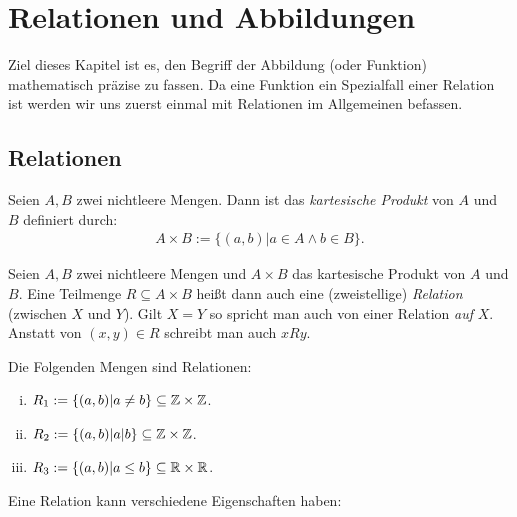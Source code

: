 \chapter{Relationen und Abbildungen}

Ziel dieses Kapitel ist es, den Begriff der Abbildung (oder Funktion) mathematisch präzise zu fassen. 
Da eine Funktion ein Spezialfall einer Relation ist werden wir uns zuerst einmal mit Relationen im Allgemeinen befassen.

\section{Relationen}

\begin{mydef}
    Seien $A,B$ zwei nichtleere Mengen. Dann ist das \textit{kartesische Produkt} von $A$ und $B$ definiert durch:
    \begin{align*}
        A \times B := \{ (a,b) | a \in A \wedge b \in B \}. 
    \end{align*}
\end{mydef}

\begin{mydef}
    Seien $A,B$ zwei nichtleere Mengen und $A \times B$ das kartesische Produkt von $A$ und $B$. 
    Eine Teilmenge $R \subseteq A \times B$ heißt dann auch eine (zweistellige) \textit{Relation} (zwischen $X$ und $Y$).
    Gilt $X = Y$ so spricht man auch von einer Relation \textit{auf} $X$.  
    Anstatt von $(x,y) \in R$ schreibt man auch $xRy$. 
\end{mydef}

\begin{example}
    Die Folgenden Mengen sind Relationen: 
    \begin{enumerate}[(i)]
        \item 
         $R_1 := \{(a,b) | a \neq b \} \subseteq \mathbb{Z} \times \mathbb{Z}$.   
        \item 
        $R_2 := \{ (a,b) | a | b \} \subseteq \mathbb{Z} \times \mathbb{Z}$.
        \item 
        $R_3 := \{(a,b) | a \leq b\} \subseteq \mathbb{R} \times \mathbb{R}$. 
    \end{enumerate}
\end{example}

Eine Relation kann verschiedene Eigenschaften haben: 

